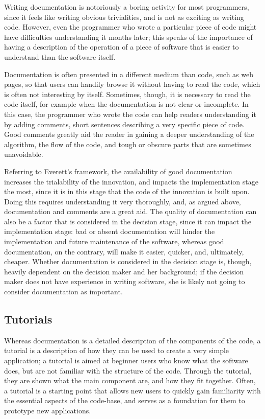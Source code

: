 \documentclass[12pt]{article}
\begin{document}
Writing documentation is notoriously a boring activity for most programmers, since it feels like writing obvious trivialities, and is not as exciting as writing code. However, even the programmer who wrote a particular piece of code might have difficulties understanding it months later; this speaks of the importance of having a description of the operation of a piece of software that is easier to understand than the software itself.

Documentation is often presented in a different medium than code, such as web pages, so that users can handily browse it without having to read the code, which is often not interesting by itself. Sometimes, though, it is necessary to read the code itself, for example when the documentation is not clear or incomplete. In this case, the programmer who wrote the code can help readers understanding it by adding comments, short sentences describing a very specific piece of code. Good comments greatly aid the reader in gaining a deeper understanding of the algorithm, the flow of the code, and tough or obscure parts that are sometimes unavoidable.

Referring to Everett's framework, the availability of good documentation increases the trialability of the innovation, and impacts the implementation stage the most, since it is in this stage that the code of the innovation is built upon. Doing this requires understanding it very thoroughly, and, as argued above, documentation and comments are a great aid. The quality of documentation can also be a factor that is considered in the decision stage, since it can impact the implementation stage: bad or absent documentation will hinder the implementation and future maintenance of the software, whereas good documentation, on the contrary, will make it easier, quicker, and, ultimately, cheaper. Whether documentation is considered in the decision stage is, though, heavily dependent on the decision maker and her background; if the decision maker does not have experience in writing software, she is likely not going to consider documentation as important.

\subsection{Tutorials}
\label{sec:orgb1a3bec}
Whereas documentation is a detailed description of the components of the code, a tutorial is a description of how they can be used to create a very simple application; a tutorial is aimed at beginner users who know what the software does, but are not familiar with the structure of the code. Through the tutorial, they are shown what the main component are, and how they fit together. Often, a tutorial is a starting point that allows new users to quickly gain familiarity with the essential aspects of the code-base, and serves as a foundation for them to prototype new applications.
\end{document}
